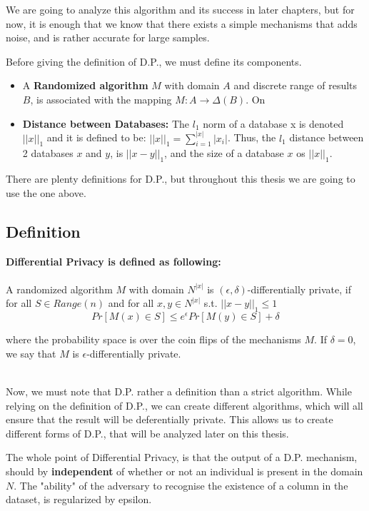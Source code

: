 We are going to analyze this algorithm and its success in later chapters, but for now, it is enough that we know that there exists a simple mechanisms that adds noise, and is rather accurate for large samples.

Before giving the definition of D.P., we must define its components. 

\begin{itemize}
    \item A \textbf {Randomized algorithm} $M$ with domain $A$ and discrete range of results $B$, is associated with the mapping $M: A\rightarrow\Delta(B)$. On
    \item \textbf{Distance between Databases:} The $l_1$ norm of a database x is denoted $||x||_1$ and it is defined to be: $||x||_1 = \sum_{i = 1}^{|x|} |x_i|$. Thus, the $l_1$ distance between 2 databases $x$ and $y$, is $||x-y||_1$, and the size of a database $x$ os $||x||_1$.
    
\end{itemize}
There are plenty definitions for D.P., but throughout this thesis we are going to use the one above.

\subsection{Definition}
\textbf{Differential Privacy is defined as following:
}\\
\\
A randomized algorithm $M$ with domain $N^{|x|}$ is $(\epsilon, \delta)$-differentially private, if for all $S \in Range(n)$ and for all $x,y \in N^{|x|}$ s.t. $||x - y||_1 \leq 1$
$$ Pr[M(x) \in S] \leq e^\epsilon Pr[M(y) \in S] + \delta$$

where the probability space is over the coin flips of the mechanisms $M$. If $\delta = 0$, we say that $M$ is $\epsilon$-differentially private.

\\
Now, we must note that D.P. rather a definition than a strict algorithm. While relying on the definition of D.P., we can create different algorithms, which will all ensure that the result will be deferentially private. This allows us to create different forms of D.P., that will be analyzed later on this thesis.

The whole point of Differential Privacy, is that the output of a D.P. mechanism, should by \textbf{independent} of whether or not an individual is present in the domain $N$. The "ability" of the adversary to recognise the existence of a column in the dataset, is regularized by epsilon.

